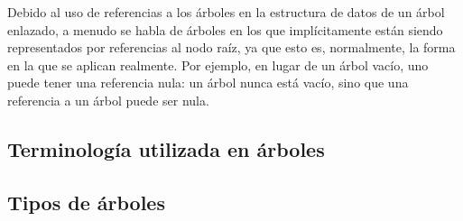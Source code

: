 Debido al uso de referencias a los árboles en la estructura de datos de un árbol enlazado, a menudo se habla de árboles en los que implícitamente están siendo representados por referencias al nodo raíz, ya que esto es, normalmente, la forma en la que se aplican realmente. Por ejemplo, en lugar de un árbol vacío, uno puede tener una referencia nula: un árbol nunca está vacío, sino que una referencia a un árbol puede ser nula. 

\subsection{Terminología utilizada en árboles}


\subsection{Tipos de árboles}
